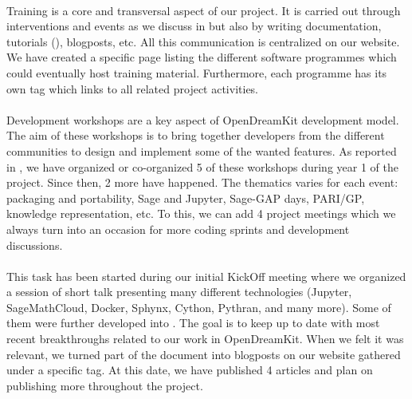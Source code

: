 \documentclass{deliverablereport}
\begin{document}
\paragraph{}

Training is a core and transversal aspect of our project. It is carried out 
through interventions and events as we discuss in  but also
by writing documentation, tutorials (), blogposts, etc. All
this communication is centralized on our website. We have created a specific 
page listing the different software programmes which could eventually host training material. Furthermore,
each programme has its own tag which links to all related project activities.

\paragraph{}
\label{dissem@devel-workshops}

Development workshops are a key aspect of OpenDreamKit development model. The aim of these workshops is to bring together developers from the different communities to design and implement some 
of the wanted features. As reported in , we have organized
or co-organized 5 of these workshops during year 1 of the project. Since then, 2 more have happened. The thematics varies
for each event: packaging and portability, Sage and Jupyter, Sage-GAP days, PARI/GP, knowledge representation, etc. To this,
we can add 4 project meetings which we always turn into an occasion for more coding sprints and development
discussions.

\paragraph{}

This task has been started during our initial KickOff meeting where we organized a session of short
talk presenting many different technologies (Jupyter, SageMathCloud, Docker, Sphynx, Cython, Pythran, and
many more). Some of them were further developed into . The goal is to
keep up to date with most recent breakthroughs related to our work in OpenDreamKit. When we felt
it was relevant, we turned part of the document into blogposts on our website gathered under a 
specific tag. At this date, we have published 4 articles and plan on publishing more throughout the
project.
\end{document}
